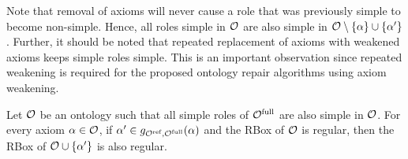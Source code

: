 Note that removal of axioms will never cause a role that was previously simple to become non-simple. Hence, all roles simple in $\mathcal{O}$ are also simple in $\mathcal{O} \setminus \{ \alpha \} \cup\{ \alpha' \}$. Further, it should be noted that repeated replacement of axioms with weakened axioms keeps simple roles simple. This is an important observation since repeated weakening is required for the proposed ontology repair algorithms using axiom weakening.

\begin{lemma} \label{lem:regularity}
  Let $\mathcal{O}$ be an ontology such that all simple roles of ${\mathcal{O}^\textnormal{full}}$ are also simple in $\mathcal{O}$. For every axiom $\alpha \in \mathcal{O}$, if $\alpha' \in g_{{\mathcal{O}^\textnormal{ref}},{\mathcal{O}^\textnormal{full}}}(\alpha)$ and the RBox of $\mathcal{O}$ is regular, then the RBox of $\mathcal{O} \cup \{ \alpha' \}$ is also regular.
\end{lemma}

